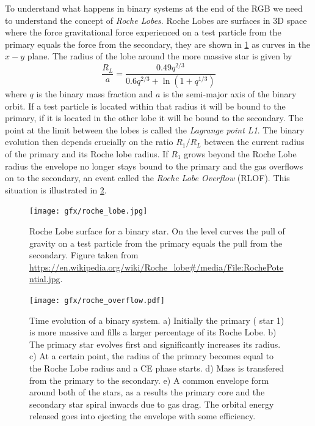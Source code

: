 \documentclass[twoside,openright,titlepage,numbers=noenddot,headinclude,%
                footinclude=true,cleardoublepage=empty,abstractoff, 
                BCOR=5mm,paper=a4,fontsize=11pt,%
                american,%
                ]{scrreprt}%
\begin{document}
To understand what happens in binary systems at the end of the RGB we need to
understand the concept of \emph{Roche Lobes}. Roche Lobes are surfaces in
3D space where the force gravitational force experienced on a test 
particle from the primary equals the force from the secondary, they are shown
in \cref{fig:roche_lobe} as curves in the $x-y$ plane. The radius of the lobe
around the more massive star is given by
\begin{equation}
    \frac{R_L}{a} = \frac{0.49q^{2/3}}{0.6q^{2/3} + \ln{(1+q^{1/3})}}
\end{equation}
where $q$ is the binary mass fraction and $a$ is the semi-major axis of the
binary orbit. If a test particle is located within that radius it will be bound
to the primary, if it is located in the other lobe it will be bound to the
secondary. The point at the limit between the lobes is called the 
\emph{Lagrange point L1}. The binary evolution then depends crucially on the
ratio $R_1/R_L$ between the current radius of the primary and its 
Roche lobe radius. If $R_1$ grows beyond the Roche Lobe radius the envelope
no longer stays bound to the primary and the gas overflows on to the secondary,
an event called the \emph{Roche Lobe Overflow} (RLOF). 
This situation is illustrated in \cref{fig:roche_overflow}. 
\begin{figure}[t!]
\centering
\texttt{[image: gfx/roche\_lobe.jpg]}
    \caption[Roche lobe surface.]{Roche Lobe surface for a binary star. 
    On the level curves the pull
    of gravity on a test particle from the primary equals the pull from the 
    secondary. Figure taken from
    \url{https://en.wikipedia.org/wiki/Roche_lobe\#/media/File:RochePotential.jpg}.}
\label{fig:roche_lobe}
\end{figure}
\begin{figure}[htb]
\centering
\texttt{[image: gfx/roche\_overflow.pdf]}
    \caption[Evolution of a binary system.]{Time evolution of a 
    binary system. a) Initially the primary (
    star 1) is 
    more massive and fills a larger percentage of its Roche Lobe. b) The 
    primary star evolves first and significantly increases its radius. c) At
    a certain point, the radius of the primary becomes equal to the Roche Lobe
    radius and a CE phase starts. d) Mass is transfered from the primary
    to the secondary. e) A common envelope form around both of the stars, as
    a results the primary core and the secondary star spiral inwards due to
    gas drag. The orbital energy released goes into ejecting the envelope with
    some efficiency.}
\label{fig:roche_overflow}
\end{figure}
\end{document}
